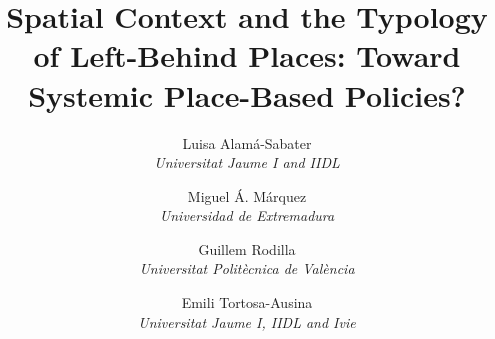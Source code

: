 \documentclass[a4paper,11pt,oneside]{article}
\begin{document}


\title{\textbf{Spatial Context and the Typology of Left-Behind Places: Toward Systemic Place-Based Policies?}}

\author{\normalsize  Luisa Alam\'a-Sabater \\ \textsl{\footnotesize Universitat Jaume I and IIDL} \and  \normalsize Miguel \'A. M\'arquez \\ \textsl{\footnotesize Universidad de Extremadura}  \and \normalsize Guillem Rodilla\\ \textsl{\footnotesize Universitat Politècnica de València}
  \and     \normalsize Emili Tortosa-Ausina \\ \textsl{\footnotesize Universitat
Jaume I, IIDL and Ivie}}






\end{document}
